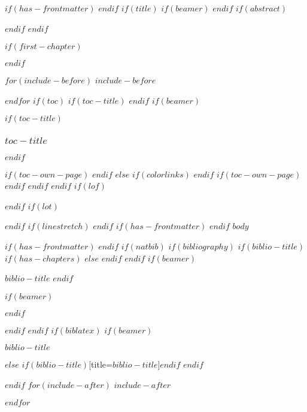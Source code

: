 \documentclass[
    $if(fontsize)$
    $fontsize$,
    $endif$
    $if(papersize)$
    $papersize$paper,
    $else$
    paper=a4,
    $endif$
    $if(beamer)$
    ignorenonframetext,
    $if(handout)$
    handout,
    $endif$
    $if(aspectratio)$
    aspectratio=$aspectratio$,
    $endif$
    $endif$
    $for(classoption)$
    $classoption$$sep$,
    $endfor$
    ,captions=tableheading
]{$if(beamer)$$documentclass$$else$$if(book)$scrbook$else$scrartcl$endif$$endif$}
\newif\ifbibliography
\begin{document}

$if(has-frontmatter)$
\frontmatter
$endif$
$if(title)$
$if(beamer)$
\frame{\titlepage}
$endif$
$if(abstract)$
\begin{abstract}
    $abstract$
\end{abstract}
$endif$
$endif$

$if(first-chapter)$
\setcounter{chapter}{$first-chapter$}
\addtocounter{chapter}{-1}
$endif$

$for(include-before)$
$include-before$

$endfor$
$if(toc)$
$if(toc-title)$
\renewcommand*\contentsname{$toc-title$}
$endif$
$if(beamer)$
\begin{frame}[allowframebreaks]
    $if(toc-title)$
    \frametitle{$toc-title$}
    $endif$
    \tableofcontents[hideallsubsections]
\end{frame}
$if(toc-own-page)$
\newpage
$endif$
$else$
{
        $if(colorlinks)$
        \hypersetup{linkcolor=$if(toccolor)$$toccolor$$else$$endif$}
        $endif$
        \setcounter{tocdepth}{$toc-depth$}
        \tableofcontents
        $if(toc-own-page)$
        \newpage
        $endif$
    }
$endif$
$endif$
$if(lof)$
\listoffigures
$endif$
$if(lot)$
\listoftables
$endif$
$if(linestretch)$
$endif$
$if(has-frontmatter)$
\mainmatter
$endif$
$body$

$if(has-frontmatter)$
\backmatter
$endif$
$if(natbib)$
$if(bibliography)$
$if(biblio-title)$
$if(has-chapters)$
\renewcommand\bibname{$biblio-title$}
$else$
\renewcommand\refname{$biblio-title$}
$endif$
$endif$
$if(beamer)$
\begin{frame}[allowframebreaks]{$biblio-title$}
    \bibliographytrue
    $endif$
    
    $if(beamer)$
\end{frame}
$endif$

$endif$
$endif$
$if(biblatex)$
$if(beamer)$
\begin{frame}[allowframebreaks]{$biblio-title$}
    \bibliographytrue
    \printbibliography[heading=none]
\end{frame}
$else$
\printbibliography$if(biblio-title)$[title=$biblio-title$]$endif$
$endif$

$endif$
$for(include-after)$
$include-after$

$endfor$
\end{document}
